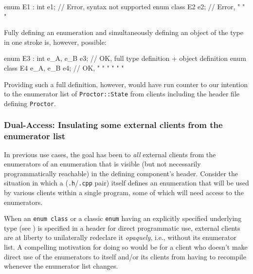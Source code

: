 \begin{emcppslisting}
enum E1 : int e1;  // Error, syntax not supported
enum class E2 e2;  // Error,    "    "     "
\end{emcppslisting}

\noindent Fully defining an enumeration and simultaneously defining an object of
the type in one stroke is, however, possible:

\begin{emcppslisting}
enum E3 : int { e_A, e_B } e3;  // OK, full type definition + object definition
enum class E4 { e_A, e_B } e4;  // OK,  "    "       "      "   "        "
\end{emcppslisting}

\noindent Providing such a full definition, however, would have run counter to our
intention to  the enumerator list of
\lstinline!Proctor::State! from clients including the header
file defining \lstinline!Proctor!.


\subsubsection[Dual-Access: Insulating some external clients from the enumerator list]{Dual-Access: Insulating some external clients from the enumerator list}\label{dual-access:-insulating-some-external-clients-from-the-enumerator-list}

In previous use cases, the goal has been to  \emph{all}
external clients from the enumerators of an enumeration that is visible
(but not necessarily programmatically reachable) in the defining
component's header. Consider the situation in which a 
(\lstinline!.h!/\lstinline!.cpp! pair) itself defines an enumeration that will
be used by various clients within a single program, some of which will
need access to the enumerators.

When an \lstinline!enum!~\lstinline!class! or a classic \lstinline!enum! having
an explicitly specified underlying type (see ) is specified in
a header for direct programmatic use, external clients are at liberty to
unilaterally redeclare it \emph{opaquely}, i.e., without its enumerator
list. A compelling motivation for doing so would be for a client who
doesn't make direct use of the enumerators to  itself
and/or its clients from having to recompile whenever the enumerator list
changes.

